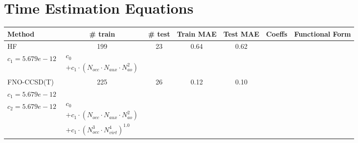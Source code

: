 \section{Time Estimation Equations}

\small
\setlength{\tabcolsep}{3pt}
\begin{longtable}{|l|c|c|c|c|p{3.2cm}|p{5.0cm}|}
\hline
\textbf{Method} & \textbf{\# train} & \textbf{\# test} & \textbf{Train MAE} & \textbf{Test MAE} & \textbf{Coeffs} & \textbf{Functional Form} \\ 
\hline
\endhead
HF & 199 & 23 & 0.64 & 0.62 & \begin{tabular}{l}\(c_{0}=8.475e+01\) \\ \(c_{1}=5.679e-12\)\end{tabular} & $\begin{array}{l}c_{0} \\ + c_{1}  \cdot  (N_{occ}  \cdot  N_{aux}  \cdot  N_{ao} ^ 2)\end{array}$ \\ 
\hline
FNO-CCSD(T) & 225 & 26 & 0.12 & 0.10 & \begin{tabular}{l}\(c_{0}=3.600e+01\) \\ \(c_{1}=5.679e-12\) \\ \(c_{2}=5.679e-12\)\end{tabular} & $\begin{array}{l}c_{0} \\ + c_{1}  \cdot  (N_{occ}  \cdot  N_{aux}  \cdot  N_{ao} ^ 2) \\ + c_{1}  \cdot  (N_{occ}^3  \cdot  N_{virt}^4)^ 1.0\end{array}$ \\ 
\hline
\end{longtable}
